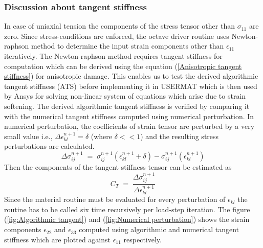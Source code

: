 \documentclass[a4paper,12pt,twoside]{report}
\begin{document}
\subsubsection{Discussion about tangent stiffness}
\indent\indent\indent In case of uniaxial tension the components of the stress tensor other than $\sigma_{11}$ are zero. Since stress-conditions are enforced, the octave driver routine uses Newton-raphson method to determine the input strain components other than $\epsilon_{11}$ iteratively. The Newton-raphson method requires tangent stiffness for computation which can be derived using the equation (\ref{Anisotropic tangent stiffness}) for anisotropic damage. This enables us to test the derived algorithmic tangent stiffness (ATS) before implementing it in USERMAT which is then used by Ansys for solving non-linear system of equations which arise due to strain softening. The derived algorithmic tangent stiffness is verified by comparing it with the numerical tangent stiffness computed using numerical perturbation. In numerical perturbation, the coefficients of strain tensor are perturbed by a very small value i.e.,  $\Delta\epsilon_{kl}^{n+1} = \delta$ (where $\delta<<1$) and the resulting stress perturbations are calculated. 
\begin{equation}
\Delta\sigma_{ij}^{n+1} \; = \; \sigma_{ij}^{n+1}(\epsilon_{kl}^{n+1}+\delta) - \sigma_{ij}^{n+1}(\epsilon_{kl}^{n+1})
\end{equation}
Then the components of the tangent stiffness tensor can be estimated as
\begin{equation}
 C_T \;  =  \;  \frac{\Delta\sigma_{ij}^{n+1}}{\Delta\epsilon_{kl}^{n+1}}
\end{equation}
Since the material routine must be evaluated for every perturbation of $\epsilon_{kl}$ the routine has to be called six time recursively per load-step iteration. The figure (\ref{fig:Algorithmic tangent})  and (\ref{fig:Numerical perturbation}) shows the strain components $\epsilon_{22}$ and $\epsilon_{33}$ computed using algorithmic and numerical tangent stiffness which are plotted against $\epsilon_{11}$  respectively.
\end{document}
